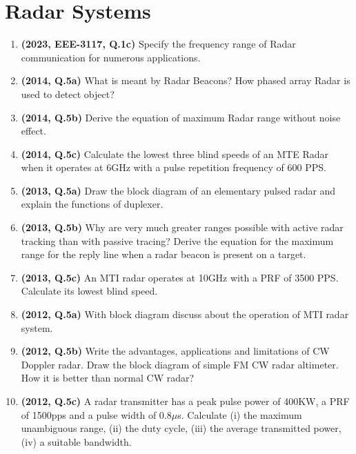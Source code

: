 \documentclass[12pt, a4paper]{article}
\begin{document}
	\section{Radar Systems}
	\begin{enumerate}
		\item \textbf{(2023, EEE-3117, Q.1c)} Specify the frequency range of Radar communication for numerous applications.
		\item \textbf{(2014, Q.5a)} What is meant by Radar Beacons? How phased array Radar is used to detect object?
		
		\item \textbf{(2014, Q.5b)} Derive the equation of maximum Radar range without noise effect.
		
		\item \textbf{(2014, Q.5c)} Calculate the lowest three blind speeds of an MTE Radar when it operates at 6GHz with a pulse repetition frequency of 600 PPS.
		
		\item \textbf{(2013, Q.5a)} Draw the block diagram of an elementary pulsed radar and explain the functions of duplexer.
		
		\item \textbf{(2013, Q.5b)} Why are very much greater ranges possible with active radar tracking than with passive tracing? Derive the equation for the maximum range for the reply line when a radar beacon is present on a target.
		
		\item \textbf{(2013, Q.5c)} An MTI radar operates at 10GHz with a PRF of 3500 PPS. Calculate its lowest blind speed.
		
		\item \textbf{(2012, Q.5a)} With block diagram discuss about the operation of MTI radar system.
		
		\item \textbf{(2012, Q.5b)} Write the advantages, applications and limitations of CW Doppler radar. Draw the block diagram of simple FM CW radar altimeter. How it is better than normal CW radar?
		
		\item \textbf{(2012, Q.5c)} A radar transmitter has a peak pulse power of 400KW, a PRF of 1500pps and a pulse width of 0.8$\mu$s. Calculate (i) the maximum unambiguous range, (ii) the duty cycle, (iii) the average transmitted power, (iv) a suitable bandwidth.
		
	\end{enumerate}
	
\end{document}

